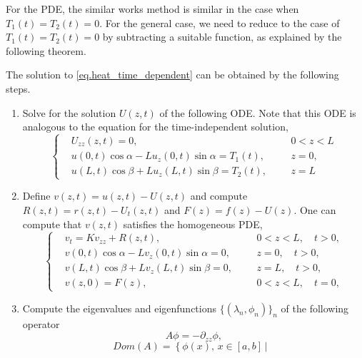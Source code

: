 For the PDE, the similar works method is similar in the case when $T_1(t) = T_2(t) = 0$. For the general case, we need to reduce to the case of $T_1(t) = T_2(t) = 0$ by subtracting a suitable function, as explained by the following theorem.
\begin{theorem}\label{th.solve_time_dependent_heat}
    The solution to \eqref{eq.heat_time_dependent} can be obtained by the following steps.
    \begin{enumerate}
        \item Solve for the solution $U(z, t)$ of the following ODE. Note that this ODE is analogous to the equation for the time-independent solution, 
        \begin{equation}\label{eq.reducing_boundary}
        \left\{\begin{aligned} 
            &U_{z z}(z, t) = 0, && 0<z<L
            \\ 
            &u(0, t) \cos \alpha-L u_z(0, t) \sin \alpha=T_1(t),\quad && z=0, 
            \\ 
            &u(L, t) \cos \beta+L u_z(L, t) \sin \beta=T_2(t), && z=L
        \end{aligned}\right.
    \end{equation}
    \item Define $v(z, t) = u(z, t) - U(z, t)$ and compute $R(z, t) = r(z, t)-U_t(z, t)$ and $F(z) = f(z)-U(z)$. One can compute that $v(z, t)$ satisfies the homogeneous PDE,
    \begin{equation}\label{eq.heat_time_dependent_homogeneized}
        \left\{\begin{aligned} 
            &v_t=K v_{z z} + R(z, t), && 0<z<L, \quad t>0, 
            \\ 
            &v(0, t) \cos \alpha-L v_z(0, t) \sin \alpha=0,\quad && z=0, \quad t>0, 
            \\ 
            &v(L, t) \cos \beta+L v_z(L, t) \sin \beta=0, && z=L, \quad t>0, 
            \\
            &v(z, 0)=F(z), && 0<z<L, \quad t=0,
        \end{aligned}\right.
    \end{equation}
    \item Compute the eigenvalues and eigenfunctions $\{(\lambda_n, \phi_n)\}_n$ of the following operator
    \begin{equation}
        A \phi = - \partial_{zz}\phi,
    \end{equation}
    \begin{equation}
        \textit{Dom}(A) = \left\{\phi(x),\, x\in [a, b]\,\Bigg|\begin{aligned}

\end{aligned}
\end{equation}
\end{enumerate}
\end{theorem}
